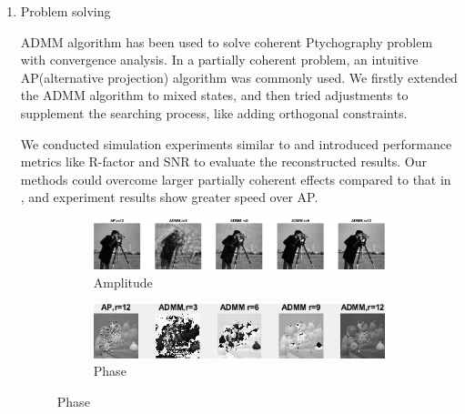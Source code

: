 \documentclass{article}
\numberwithin{equation}{section}
\begin{document}
\begin{enumerate}[leftmargin=*]
 
  

\item Problem solving

 ADMM algorithm has been used to solve coherent Ptychography problem with convergence analysis\cite{admm}. In a partially coherent problem, an intuitive AP(alternative projection) algorithm was commonly used. We firstly extended the ADMM algorithm to mixed states, and then tried adjustments to supplement the searching process, like adding orthogonal constraints. 

We conducted simulation experiments similar to \cite{chang} and introduced performance metrics like R-factor and SNR to evaluate the reconstructed results. Our methods could overcome larger partially coherent effects compared to that in \cite{chang}, and experiment results show greater speed over AP.
 
 \begin{figure}[H]
 \centering
 \caption{}
 \begin{subfigure}{1\textwidth}
     \centering
     \includegraphics[width=0.9\linewidth]{../figures/modes_u.eps}  
    \caption{Amplitude}
     \label{fig:modes_u}
  \end{subfigure}
  \begin{subfigure}{1\textwidth}
     \centering
     \includegraphics[width=.9\linewidth]{../figures/modes_u_phaze.png}  
     \caption{Phase}
     \label{fig:modes_u_phaze}
  \end{subfigure}
  
     \label{fig:modes_images}
 
  \end{figure}
  

\end{enumerate}
\end{document}

